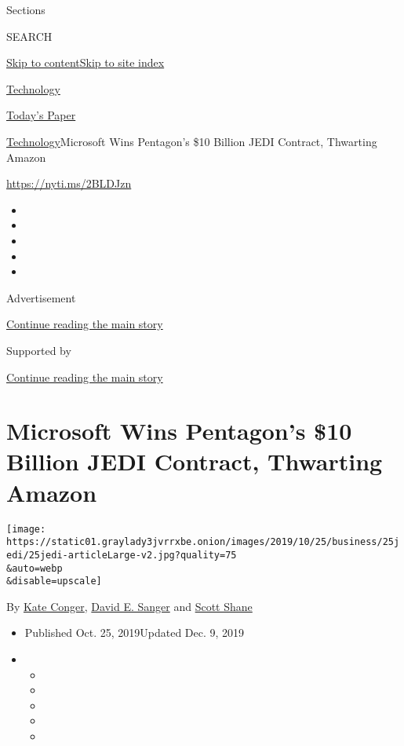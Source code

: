 Sections

SEARCH

\protect\hyperlink{site-content}{Skip to
content}\protect\hyperlink{site-index}{Skip to site index}

\href{https://www.nytimes3xbfgragh.onion/section/technology}{Technology}

\href{https://myaccount.nytimes3xbfgragh.onion/auth/login?response_type=cookie\&client_id=vi}{}

\href{https://www.nytimes3xbfgragh.onion/section/todayspaper}{Today's
Paper}

\href{/section/technology}{Technology}\textbar{}Microsoft Wins
Pentagon's \$10 Billion JEDI Contract, Thwarting Amazon

\href{https://nyti.ms/2BLDJzn}{https://nyti.ms/2BLDJzn}

\begin{itemize}
\item
\item
\item
\item
\item
\end{itemize}

Advertisement

\protect\hyperlink{after-top}{Continue reading the main story}

Supported by

\protect\hyperlink{after-sponsor}{Continue reading the main story}

\hypertarget{microsoft-wins-pentagons-10-billion-jedi-contract-thwarting-amazon}{%
\section{Microsoft Wins Pentagon's \$10 Billion JEDI Contract, Thwarting
Amazon}\label{microsoft-wins-pentagons-10-billion-jedi-contract-thwarting-amazon}}

\texttt{[image: https://static01.graylady3jvrrxbe.onion/images/2019/10/25/business/25jedi/25jedi-articleLarge-v2.jpg?quality=75\\\&auto=webp\\\&disable=upscale]}

By \href{https://www.nytimes3xbfgragh.onion/by/kate-conger}{Kate
Conger},
\href{https://www.nytimes3xbfgragh.onion/by/david-e-sanger}{David E.
Sanger} and
\href{https://www.nytimes3xbfgragh.onion/by/scott-shane}{Scott Shane}

\begin{itemize}
\item
  Published Oct. 25, 2019Updated Dec. 9, 2019
\item
  \begin{itemize}
  \item
  \item
  \item
  \item
  \item
  \end{itemize}
\end{itemize}

